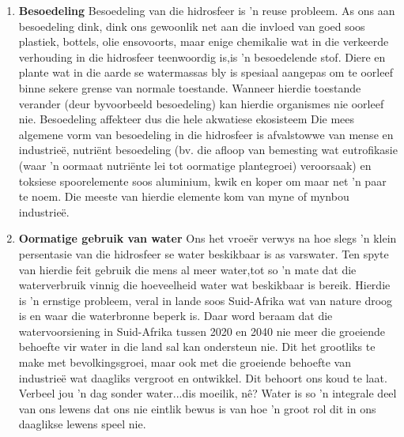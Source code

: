       \label{m38138*id342223}\begin{enumerate}[noitemsep, label=\textbf{\arabic*}. ] 
            \label{m38138*uid91}\item \textbf{Besoedeling}\newline
Besoedeling van die hidrosfeer is   'n reuse probleem. As ons aan besoedeling dink, dink ons gewoonlik net aan die invloed van goed soos plastiek, bottels, olie ensovoorts, maar enige chemikalie wat in die verkeerde verhouding in die hidrosfeer teenwoordig is,is   'n besoedelende stof. Diere en plante wat in die aarde se watermassas bly is spesiaal aangepas om te oorleef binne sekere grense van normale toestande. Wanneer hierdie toestande verander (deur byvoorbeeld besoedeling) kan hierdie organismes nie oorleef nie. Besoedeling affekteer dus die hele akwatiese ekosisteem Die mees algemene vorm van besoedeling in die hidrosfeer is afvalstowwe van mense en industrie\"{e}, nutriënt besoedeling (bv. die afloop van bemesting wat eutrofikasie (waar   'n oormaat nutriënte lei tot oormatige plantegroei) veroorsaak) en toksiese spoorelemente soos aluminium, kwik en koper om maar net   'n paar te noem. Die meeste van hierdie elemente kom van myne of mynbou industrieë.
\label{m38138*uid87}\item \textbf{Oormatige gebruik van water}\newline
Ons het vroe\"{e}r verwys na hoe slegs   'n klein persentasie van die hidrosfeer se water beskikbaar is as varswater. Ten spyte van hierdie feit gebruik die mens al meer water,tot so   'n mate dat die waterverbruik vinnig die hoeveelheid water wat beskikbaar is bereik. Hierdie is   'n ernstige probleem, veral in lande soos Suid-Afrika wat van nature droog is en waar die waterbronne beperk is. Daar word beraam dat die watervoorsiening in Suid-Afrika tussen 2020 en 2040 nie meer die groeiende behoefte vir water in die land sal kan ondersteun nie. Dit het grootliks te make met bevolkingsgroei, maar ook met die groeiende behoefte van industrieë wat daagliks vergroot en ontwikkel. Dit behoort ons koud te laat. Verbeel jou   'n dag sonder water...dis moeilik, nê? Water is so   'n integrale deel van ons lewens dat ons nie eintlik bewus is van hoe   'n groot rol dit in ons daaglikse lewens speel nie.
\end{enumerate}
\label{m38138*secfhsst!!!underscore!!!id1046}
